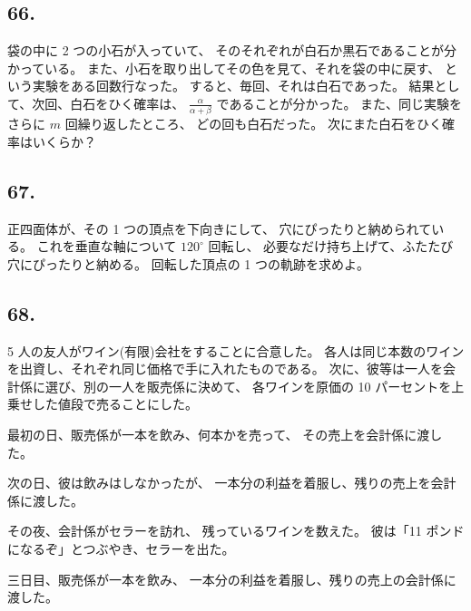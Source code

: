 \begin{flushright}
[5/89]
\end{flushright}

\subsection*{66.}

袋の中に 2 つの小石が入っていて、
そのそれぞれが白石か黒石であることが分かっている。
また、小石を取り出してその色を見て、それを袋の中に戻す、
という実験をある回数行なった。
すると、毎回、それは白石であった。
結果として、次回、白石をひく確率は、
$\frac{\alpha}{\alpha + \beta}$ であることが分かった。
また、同じ実験をさらに $m$ 回繰り返したところ、
どの回も白石だった。
次にまた白石をひく確率はいくらか？

\begin{flushright}
[9/89]
\end{flushright}

\subsection*{67.}

正四面体が、その 1 つの頂点を下向きにして、
穴にぴったりと納められている。
これを垂直な軸について $120^\circ$ 回転し、
必要なだけ持ち上げて、ふたたび穴にぴったりと納める。
回転した頂点の 1 つの軌跡を求めよ。

\begin{flushright}
[27/1/72]
\end{flushright}

\subsection*{68.}

5 人の友人がワイン(有限)会社をすることに合意した。
各人は同じ本数のワインを出資し、それぞれ同じ価格で手に入れたものである。
次に、彼等は一人を会計係に選び、別の一人を販売係に決めて、
各ワインを原価の 10 パーセントを上乗せした値段で売ることにした。

最初の日、販売係が一本を飲み、何本かを売って、
その売上を会計係に渡した。

次の日、彼は飲みはしなかったが、
一本分の利益を着服し、残りの売上を会計係に渡した。

その夜、会計係がセラーを訪れ、
残っているワインを数えた。
彼は「11 ポンドになるぞ」とつぶやき、セラーを出た。

三日目、販売係が一本を飲み、
一本分の利益を着服し、残りの売上の会計係に渡した。

